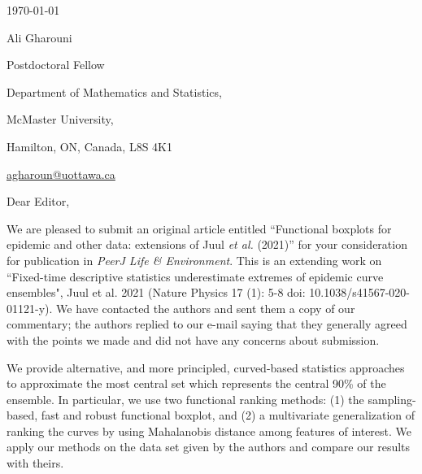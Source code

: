 \documentclass[12pt,letterpaper]{letter}
\newcommand{\journalname}{\emph{PeerJ Life \& Environment}\xspace}
\begin{document}
\begin{multicols}{2}
\footnotesize
\begin{flushleft}



% 

\vfill

{\normalsize \mydate
\today}
\end{flushleft}

\columnbreak

\begin{flushright}
Ali Gharouni

Postdoctoral Fellow 

Department of Mathematics and Statistics,

McMaster University,

Hamilton, ON, Canada, L8S 4K1

\href{mailto:agharoun@uottawa.ca}{agharoun@uottawa.ca}
\end{flushright}

\end{multicols}

\setlength{\parskip}{1em}
\thispagestyle{empty}

\vspace{-1em}

Dear Editor,

We are pleased to submit an original article entitled ``Functional boxplots for epidemic and other data: extensions of Juul \emph{et al.} (2021)'' for your consideration for publication in \journalname{}. This is an extending work on ``Fixed-time descriptive statistics underestimate extremes of epidemic curve ensembles", Juul et al. 2021 (Nature Physics 17 (1): 5-8 doi: 10.1038/s41567-020-01121-y). We have contacted the authors and sent them a copy of our commentary; the authors replied to our e-mail saying that they generally agreed with the points we made and did not have any concerns about submission.

We provide alternative, and more principled, curved-based statistics approaches to approximate the most central set which represents the central 90\% of the ensemble. In particular, we use two functional ranking methods: (1) the sampling-based, fast and robust functional boxplot, and (2) a multivariate generalization of ranking the curves by using Mahalanobis distance among features of interest. We apply our methods on the data set given by the authors and compare our results with theirs.
\end{document}
